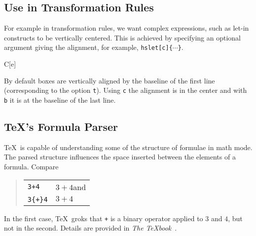 \documentclass[a4paper]{article}
\newcommand{\cmd}[1]{\texttt{\backslashchar#1}}
\begin{document}
\subsection{Use in Transformation Rules}

For example in transformation rules, we want complex expressions, such as
let-in constructs to be vertically centered.  This is achieved by specifying
an optional argument giving the alignment, for example,
\cmd{hslet[c]\{$\cdots$\}}. 
%
\begin{haskell}
  \Longrightarrow
  C[e]
\end{haskell}
%
By default boxes are vertically aligned by the baseline of the first line
(corresponding to the option \texttt{t}).  Using \texttt{c} the alignment is
in the center and with \texttt{b} it is at the baseline of the last line.

\subsection{\TeX's Formula Parser}

\TeX\ is capable of understanding some of the structure of formulae in math
mode.  The parsed structure influences the space inserted between the elements 
of a formula.  Compare 
%
\begin{quote}
  \begin{tabular}{l@{~$\Longrightarrow$~}l}
    \texttt{3+4}     & \(3+4\)\quad and\\
    \texttt{3\{+\}4} & \(3{+}4\)
  \end{tabular}
\end{quote}
%
In the first case, \TeX\ groks that \texttt{+} is a binary operator applied to
$3$ and $4$, but not in the second.  Details are provided in \emph{The
  \TeX{}book}~\cite{knuth:tex}.



\end{document}
